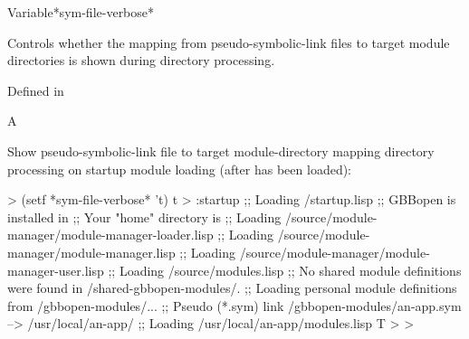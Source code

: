 \documentclass[10pt,twoside,english,pdftex]{article}
\begin{document}

\begin{functiondoc}%
  {Variable}{*sym-file-verbose*}{}%

\fnsyntax

\fnpurpose Controls whether the mapping from  pseudo-symbolic-link
files to target module directories is shown during
 directory processing.

\fnpackage {}

\fnmodule Defined in 

\fnvaluetype A 

\fninitialvalue \nil

\fnexample 
%
Show  pseudo-symbolic-link file to target module-directory mapping
 directory processing on startup module loading (after
 has been loaded):
%
\W\supp
\begin{example}
  > (setf *sym-file-verbose* 't)
  t
  > :startup
  ;; Loading /startup.lisp
  ;; GBBopen is installed in 
  ;; Your "home" directory is 
  ;;  Loading /source/module-manager/module-manager-loader.lisp
  ;;   Loading /source/module-manager/module-manager.lisp
  ;;     Loading /source/module-manager/module-manager-user.lisp
  ;;  Loading /source/modules.lisp
  ;; No shared module definitions were found in /shared-gbbopen-modules/.
  ;; Loading personal module definitions from /gbbopen-modules/...
  ;; Pseudo (*.sym) link /gbbopen-modules/an-app.sym --> /usr/local/an-app/
  ;;  Loading /usr/local/an-app/modules.lisp
  T
  > 
  >
\end{example}

\end{functiondoc}

\end{document}
